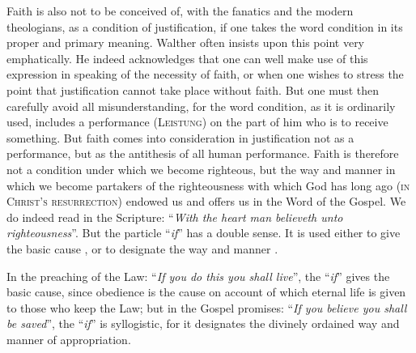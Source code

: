                 Faith is also not to be conceived of, with the fanatics and the modern theologians, as a condition of justification, if one takes the word condition in its proper and primary meaning.  Walther often insists upon this point very emphatically.  He indeed acknowledges that one can well make use of this expression in speaking of the necessity of faith, or when one wishes to stress the point that justification cannot take place without faith.  But one must then carefully avoid all misunderstanding, for the word condition, as it is ordinarily used, includes a performance {\scriptsize\textsc{(Leistung)}} on the part of him who is to receive something.  But faith comes into consideration in justification not as a performance, but as the antithesis of all human performance.  Faith is therefore not a condition under which we become righteous, but the way and manner in which we become partakers of the righteousness with which God has long ago {\scriptsize\textsc{(in Christ’s resurrection)}} endowed us and offers us in the Word of the Gospel.  We do indeed read in the Scripture: “\textit{With the heart man believeth unto righteousness}”.  But the particle “\textit{if}” has a double sense.  It is used either to give the basic cause , or to designate the way and manner .\par  In the preaching of the Law: “\textit{If you do this you shall live}”, the “\textit{if}” gives the basic cause, since obedience is the cause on account of which eternal life is given to those who keep the Law; but in the Gospel promises: “\textit{If you believe you shall be saved}”, the “\textit{if}” is syllogistic, for it designates the divinely ordained way and manner of appropriation.

